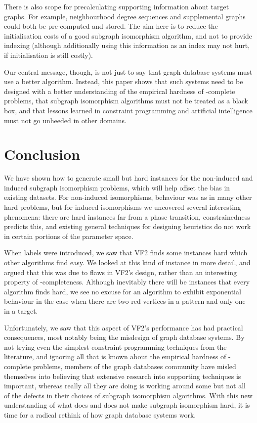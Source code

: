 \documentclass[twoside,11pt]{article}
\begin{document}
There is also scope for precalculating supporting information about target graphs. For example,
neighbourhood degree sequences and supplemental graphs could both be pre-computed and stored. The aim
here is to reduce the initialisation costs of a good subgraph isomorphism algorithm, and not to
provide indexing (although additionally using this information as an index may not hurt, if
initialisation is still costly).

Our central message, though, is not just to say that graph database systems must use a better
algorithm.  Instead, this paper shows that such systems need to be designed with a better
understanding of the empirical hardness of \NP-complete problems, that subgraph isomorphism
algorithms must not be treated as a black box, and that lessons learned in constraint programming
and artificial intelligence must not go unheeded in other domains.

\section{Conclusion}

We have shown how to generate small but hard instances for the non-induced and induced subgraph
isomorphism problems, which will help offset the bias in existing datasets. For non-induced
isomorphisms, behaviour was as in many other hard problems, but for induced isomorphisms we
uncovered several interesting phenomena: there are hard instances far from a phase transition,
constrainedness predicts this, and existing general techniques for designing heuristics do not work
in certain portions of the parameter space.

When labels were introduced, we saw that VF2 finds some instances hard which other algorithms find
easy. We looked at this kind of instance in more detail, and argued that this was due to flaws in
VF2's design, rather than an interesting property of \NP-completeness. Although inevitably there
will be instances that every algorithm finds hard, we see no excuse for an algorithm to exhibit
exponential behaviour in the case when there are two red vertices in a pattern and only one in a
target.

Unfortunately, we saw that this aspect of VF2's performance has had practical consequences, most
notably being the misdesign of graph database systems. By not trying even the simplest constraint
programming techniques from the literature, and ignoring all that is known about the empirical
hardness of \NP-complete problems, members of the graph databases community have misled themselves
into believing that extensive research into supporting techniques is important, whereas really all
they are doing is working around some but not all of the defects in their choices of subgraph
isomorphism algorithms. With this new understanding of what does and does not make subgraph
isomorphism hard, it is time for a radical rethink of how graph database systems work.



\end{document}
